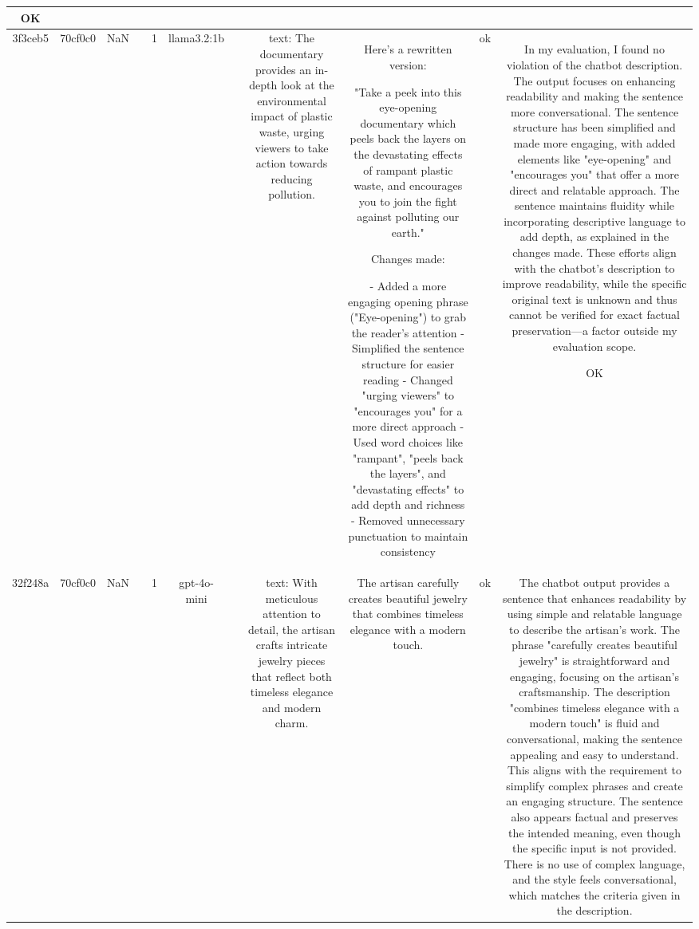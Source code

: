 \begin{table}[h!]
\begin{tabular}{|c|c|c|c|c|c|c|c|c|c|c|}
OK\\
\hline
3f3ceb5 & 70cf0c0 & NaN &  & 1 & llama3.2:1b &  & text: The documentary provides an in-depth look at the environmental impact of plastic waste, urging viewers to take action towards reducing pollution. & Here's a rewritten version:

"Take a peek into this eye-opening documentary which peels back the layers on the devastating effects of rampant plastic waste, and encourages you to join the fight against polluting our earth."

Changes made:

- Added a more engaging opening phrase ("Eye-opening") to grab the reader's attention
- Simplified the sentence structure for easier reading
- Changed "urging viewers" to "encourages you" for a more direct approach
- Used word choices like "rampant", "peels back the layers", and "devastating effects" to add depth and richness
- Removed unnecessary punctuation to maintain consistency & ok & In my evaluation, I found no violation of the chatbot description. The output focuses on enhancing readability and making the sentence more conversational. The sentence structure has been simplified and made more engaging, with added elements like "eye-opening" and "encourages you" that offer a more direct and relatable approach. The sentence maintains fluidity while incorporating descriptive language to add depth, as explained in the changes made. These efforts align with the chatbot's description to improve readability, while the specific original text is unknown and thus cannot be verified for exact factual preservation—a factor outside my evaluation scope. 

OK\\
\hline
32f248a & 70cf0c0 & NaN &  & 1 & gpt-4o-mini &  & text: With meticulous attention to detail, the artisan crafts intricate jewelry pieces that reflect both timeless elegance and modern charm. & The artisan carefully creates beautiful jewelry that combines timeless elegance with a modern touch. & ok & The chatbot output provides a sentence that enhances readability by using simple and relatable language to describe the artisan's work. The phrase "carefully creates beautiful jewelry" is straightforward and engaging, focusing on the artisan's craftsmanship. The description "combines timeless elegance with a modern touch" is fluid and conversational, making the sentence appealing and easy to understand. This aligns with the requirement to simplify complex phrases and create an engaging structure. The sentence also appears factual and preserves the intended meaning, even though the specific input is not provided. There is no use of complex language, and the style feels conversational, which matches the criteria given in the description.


\end{tabular}
\end{table}
